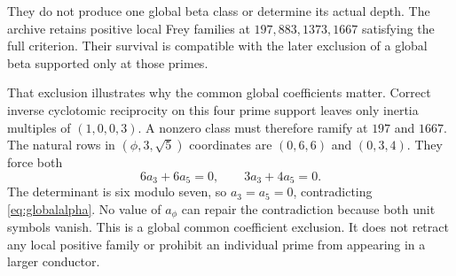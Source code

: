 They do not produce one global beta class or determine its actual depth. The archive retains positive local Frey families at $197,883,1373,1667$ satisfying the full criterion. Their survival is compatible with the later exclusion of a global beta supported only at those primes.

That exclusion illustrates why the common global coefficients matter. Correct inverse cyclotomic reciprocity on this four prime support leaves only inertia multiples of $(1,0,0,3)$. A nonzero class must therefore ramify at $197$ and $1667$. The natural rows in $(\phi,3,\sqrt5)$ coordinates are $(0,6,6)$ and $(0,3,4)$. They force both
\[
6a_3+6a_5=0,\qquad3a_3+4a_5=0.
\]
The determinant is six modulo seven, so $a_3=a_5=0$, contradicting \eqref{eq:globalalpha}. No value of $a_\phi$ can repair the contradiction because both unit symbols vanish. This is a global common coefficient exclusion. It does not retract any local positive family or prohibit an individual prime from appearing in a larger conductor.
